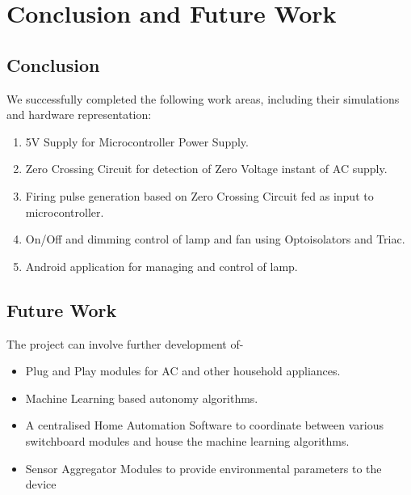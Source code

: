 \chapter{Conclusion and Future Work}
        \section{Conclusion}
        We successfully completed the following work areas, including their simulations and hardware representation:
			\begin{enumerate}
				\item 5V Supply for Microcontroller Power Supply.
				
				\item Zero Crossing Circuit for detection of Zero Voltage instant of AC supply.
				
				\item Firing pulse generation based on Zero Crossing Circuit fed as input to microcontroller.
				
				\item On/Off and dimming control of lamp and fan using Optoisolators and Triac.
				
				\item Android application for managing and control of lamp.
			\end{enumerate}
        \section{Future Work}
        The project can involve further development of-
		\begin{itemize}
			\item Plug and Play modules for AC and other household appliances.
			
			\item Machine Learning based autonomy algorithms.
			
			\item A centralised Home Automation Software to coordinate between various switchboard modules and house the machine learning algorithms.
			
			\item Sensor Aggregator Modules to provide environmental parameters to the device
		\end{itemize}
    